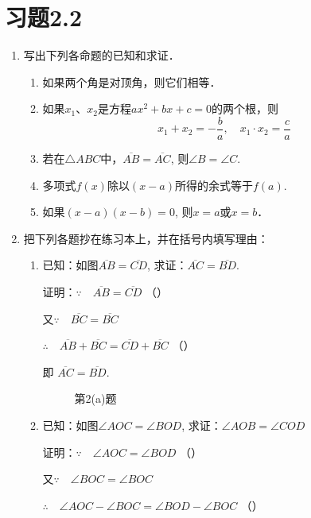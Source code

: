\section*{习题2.2}
\begin{enumerate}
	\item 写出下列各命题的已知和求证．
\begin{enumerate}
\item 如果两个角是对顶角，则它们相等．
\item 如果$x_1$、$x_2$是方程$ax^2+bx+c=0$的两个根，则
	$$x_1+x_2=-\frac{b}{a},\quad x_1\cdot x_2=\frac{c}{a}$$
	\item 若在$\triangle ABC$中，$\overline{AB}=\overline{AC}$, 则$\angle B=\angle C$.
	\item 多项式$f(x)$除以$(x-a)$所得的余式等于$f(a)$.
	\item 如果$(x-a)(x-b)=0$, 则$x=a$或$x=b$．
\end{enumerate}

\item 把下列各题抄在练习本上，并在括号内填写理由：
\begin{enumerate}
	\item 已知：如图$\overline{AB}=\overline{CD}$, 	求证：$\overline{AC}=\overline{BD}$.

	证明：$\because\quad \overline{AB}=\overline{CD}$ （\qquad）

	又$\because\quad \overline{BC}=\overline{BC}$

	$\therefore\quad \overline{AB}+\overline{BC}=\overline{CD}+\overline{BC}$ （\qquad）

	即 $\overline{AC}=\overline{BD}$.

\begin{figure}[htp]
	\centering
{}
	\caption{第2(a)题}
\end{figure}

\item 已知：如图$\angle AOC=\angle BOD$, 求证：$\angle AOB=\angle COD$

证明：$\because\quad \angle AOC=\angle BOD$ （\qquad）
	
又$\because\quad \angle BOC=\angle BOC$

$\therefore\quad \angle AOC-\angle BOC=\angle BOD-\angle BOC$ （\qquad ）


\end{enumerate}
\end{enumerate}

